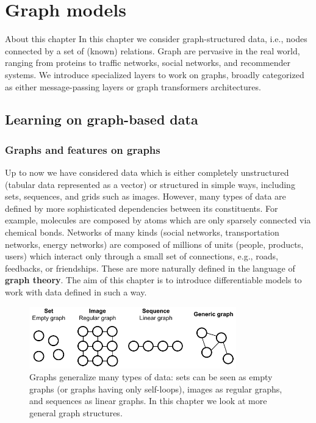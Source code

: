 \chapter{Graph models}
\label{chap:gnns}

\begin{supportbox}{About this chapter}
In this chapter we consider graph-structured data, i.e., nodes connected by a set of (known) relations. Graph are pervasive in the real world, ranging from proteins to traffic networks, social networks, and recommender systems. We introduce specialized layers to work on graphs, broadly categorized as either message-passing layers or graph transformers architectures.
\end{supportbox}

\section{Learning on graph-based data}
\subsection{Graphs and features on graphs}

Up to now we have considered data which is either completely unstructured  (tabular data represented as a vector) or structured in simple ways, including sets, sequences, and grids such as images. However, many types of data are defined by more sophisticated dependencies between its constituents. For example, molecules are composed by atoms which are only sparsely connected via chemical bonds. Networks of many kinds (social networks, transportation networks, energy networks) are composed of millions of units (people, products, users) which interact only through a small set of connections, e.g., roads, feedbacks, or friendships. These are more naturally defined in the language of \textbf{graph theory}. The aim of this chapter is to introduce differentiable models to work with data defined in such a way.

\begin{figure}[t]
    \centering
    \includegraphics[width=0.8\textwidth]{images/graphs}
    \caption{Graphs generalize many types of data: sets can be seen as empty graphs (or graphs having only self-loops), images as regular graphs, and sequences as linear graphs. In this chapter we look at more general graph structures.}
    \label{fig:graphs}
\end{figure}

